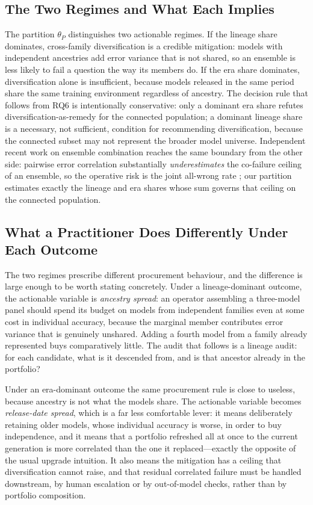 \documentclass{ieeeaccess}
\theoremstyle{definition}
\theoremstyle{plain}
\begin{document}
\subsection{The Two Regimes and What Each Implies}
The partition $\theta_{P}$ distinguishes two actionable regimes. If the lineage
share dominates, cross-family diversification is a credible mitigation: models with
independent ancestries add error variance that is not shared, so an ensemble is
less likely to fail a question the way its members do. If the era share dominates,
diversification alone is insufficient, because models released in the same period
share the same training environment regardless of ancestry. The decision rule that
follows from RQ6 is intentionally conservative: only a dominant era share refutes
diversification-as-remedy for the connected population; a dominant lineage share is
a necessary, not sufficient, condition for recommending diversification, because
the connected subset may not represent the broader model universe. Independent
recent work on ensemble combination reaches the same boundary from the other side:
pairwise error correlation substantially \emph{underestimates} the co-failure
ceiling of an ensemble, so the operative risk is the joint all-wrong rate
\cite{chen2026}; our partition estimates exactly the lineage and era shares whose
sum governs that ceiling on the connected population.

\subsection{What a Practitioner Does Differently Under Each Outcome}
The two regimes prescribe different procurement behaviour, and the difference
is large enough to be worth stating concretely. Under a lineage-dominant
outcome, the actionable variable is \emph{ancestry spread}: an operator
assembling a three-model panel should spend its budget on models from
independent families even at some cost in individual accuracy, because the
marginal member contributes error variance that is genuinely unshared. Adding a
fourth model from a family already represented buys comparatively little. The
audit that follows is a lineage audit: for each candidate, what is it descended
from, and is that ancestor already in the portfolio?

Under an era-dominant outcome the same procurement rule is close to useless,
because ancestry is not what the models share. The actionable variable becomes
\emph{release-date spread}, which is a far less comfortable lever: it means
deliberately retaining older models, whose individual accuracy is worse, in
order to buy independence, and it means that a portfolio refreshed all at once
to the current generation is more correlated than the one it replaced---exactly
the opposite of the usual upgrade intuition. It also means the mitigation has a
ceiling that diversification cannot raise, and that residual correlated failure
must be handled downstream, by human escalation or by out-of-model checks,
rather than by portfolio composition.
\end{document}
